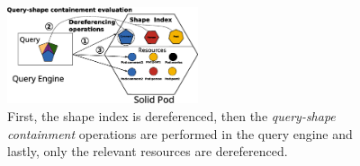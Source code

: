 \begin{figure}
    \centering
    \includegraphics[width=0.50\textwidth]{figure/shape_containement}
    \caption{First, the shape index is dereferenced, 
    then the \emph{query-shape containment} operations are performed in the query engine and lastly, only the relevant resources are dereferenced.}
    \label{fig:shape_index}
\end{figure}
